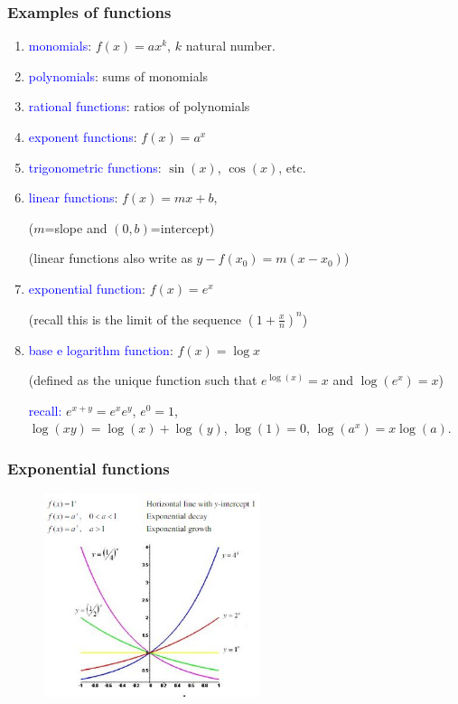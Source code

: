 \documentclass[11pt,aspectratio=169]{beamer}
\begin{document}
\begin{frame}
\frametitle{Examples of functions}
\begin{enumerate}
\item \textcolor{blue}{monomials}: $f(x)=a x^k$, $k$ natural number.

\item \textcolor{blue}{polynomials}: sums of monomials

\item \textcolor{blue}{rational functions}: ratios of polynomials

\item \textcolor{blue}{exponent functions}: $f(x)=a^x$

\item \textcolor{blue}{trigonometric functions}: $\sin(x)$, $\cos(x)$, etc.

\item \textcolor{blue}{linear functions}: $f(x)=mx+b$, \begin{tiny}($m$=slope and $(0,b)$=intercept) 

(linear functions also write as $y-f(x_0)=m(x-x_0)$)
\end{tiny} 

\item \textcolor{blue}{exponential function}: $f(x)=e^x$ \begin{tiny}(recall this is the limit of the sequence $\left(1+\frac{x}{n}\right)^n$)  \end{tiny} 

\item \textcolor{blue}{base e logarithm function}: $f(x)=\log x$ \begin{tiny}(defined as the unique function such that $e^{\log (x)}=x$ and $\log(e^x)=x$)  \end{tiny} 

\qquad \textcolor{blue}{recall:} $e^{x+y}=e^x e^y$, $e^0=1$,\\ \qquad\quad\qquad $\log(xy)=\log(x)+\log(y)$, $\log(1)=0$, $\log(a^x)=x\log(a)$.
\end{enumerate}

\end{frame}

\begin{frame}
\frametitle{Exponential functions}
\begin{figure}
\includegraphics[width=2.5in]{img/exp} 
\end{figure}
\end{frame}
\end{document}
